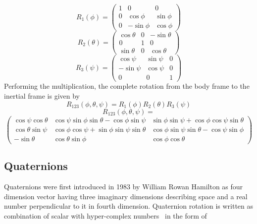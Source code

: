 \begin{equation*}
R_{1} (\phi )=\begin{pmatrix}
1 & 0 & 0\\
0 & \cos \phi  & \sin \phi \\
0 & -\sin \phi  & \cos \phi 
\end{pmatrix}
\end{equation*}
\begin{equation*}
R_{2} (\theta )=\begin{pmatrix}
\cos \theta  & 0 & -\sin \theta \\
0 & 1 & 0\\
\sin \theta  & 0 & \cos \theta 
\end{pmatrix}
\end{equation*}
\begin{equation*}
R_{3} (\psi )=\begin{pmatrix}
\cos \psi  & \sin \psi  & 0\\
-\sin \psi  & \cos \psi  & 0\\
0 & 0 & 1
\end{pmatrix}
\end{equation*}
Performing the multiplication, the complete rotation from the body frame to the inertial frame is given by
\begin{equation*}
    R_{123}( \phi ,\theta ,\psi ) =R_{1} (\phi )R_{2} (\theta )R_{3} (\psi )
\end{equation*}
\begin{equation*}
R_{123} (\phi ,\theta ,\psi )=
\end{equation*}
\begin{equation*}
    \begin{pmatrix}
\cos \psi \cos \theta  & \cos \psi \sin \phi \sin \theta -\cos \phi \sin \psi  & \sin \phi \sin \psi +\cos \phi \cos \psi \sin \theta \\
\cos \theta \sin \psi  & \cos \phi \cos \psi +\sin \phi \sin \psi \sin \theta  & \cos \phi \sin \psi \sin \theta -\cos \psi \sin \phi \\
-\sin \theta  & \cos \theta \sin \phi  & \cos \phi \cos \theta 
\end{pmatrix}
\end{equation*}

\subsection{Quaternions}
Quaternions were first introduced in 1983 by William Rowan Hamilton as four dimension vector having three imaginary dimensions describing space and a real number perpendicular to it in fourth dimension. Quaternion rotation is written as combination of scalar with hyper-complex numbers \ in the form of 


